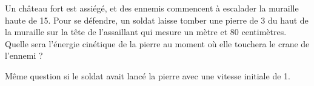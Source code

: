 

\begin{exercice}\label{exo007}

Un château fort est assiégé, et des ennemis commencent à escalader la muraille haute de \unit{15}{\meter}. Pour se défendre, un soldat laisse tomber une pierre de \unit{3}{\kilo\gram} du haut de la muraille sur la tête de l'assaillant qui mesure un mètre et 80 centimètres. Quelle sera l'énergie cinétique de la pierre au moment où elle touchera le crane de l'ennemi ?

Même question si le soldat avait lancé la pierre avec une vitesse initiale de \unit{1}{\meter\per\second}.

\end{exercice}

